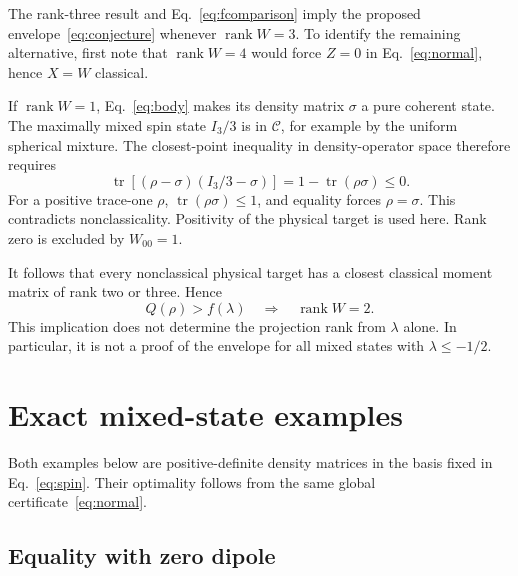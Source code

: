 \documentclass[aps,pra,reprint,amsmath,amssymb,superscriptaddress,longbibliography]{revtex4-2}
\newcommand{\tr}{\operatorname{tr}}
\newcommand{\rank}{\operatorname{rank}}
\newcommand{\Id}{I}
\newcommand{\Ccal}{\mathcal C}
\begin{document}
The rank-three result and Eq.~\eqref{eq:fcomparison} imply the proposed envelope~\eqref{eq:conjecture} whenever \(\rank W=3\). To identify the remaining alternative, first note that \(\rank W=4\) would force \(Z=0\) in Eq.~\eqref{eq:normal}, hence \(X=W\) classical.

If \(\rank W=1\), Eq.~\eqref{eq:body} makes its density matrix \(\sigma\) a pure coherent state. The maximally mixed spin state \(\Id_3/3\) is in \(\Ccal\), for example by the uniform spherical mixture. The closest-point inequality in density-operator space therefore requires
\begin{equation}
 \tr[(\rho-\sigma)(\Id_3/3-\sigma)]
          =1-\tr(\rho\sigma)\leq0.
 \label{eq:rankone}
\end{equation}
For a positive trace-one \(\rho\), \(\tr(\rho\sigma)\leq1\), and equality forces \(\rho=\sigma\). This contradicts nonclassicality. Positivity of the physical target is used here. Rank zero is excluded by \(W_{00}=1\).

It follows that every nonclassical physical target has a closest classical moment matrix of rank two or three. Hence
\begin{equation}
 Q(\rho)>f(\lambda)\quad\Longrightarrow\quad\rank W=2.
 \label{eq:reduction}
\end{equation}
This implication does not determine the projection rank from \(\lambda\) alone. In particular, it is not a proof of the envelope for all mixed states with \(\lambda\leq-1/2\).

\section{Exact mixed-state examples}
\label{sec:examples}

Both examples below are positive-definite density matrices in the basis fixed in Eq.~\eqref{eq:spin}. Their optimality follows from the same global certificate~\eqref{eq:normal}.

\subsection{Equality with zero dipole}
\end{document}
